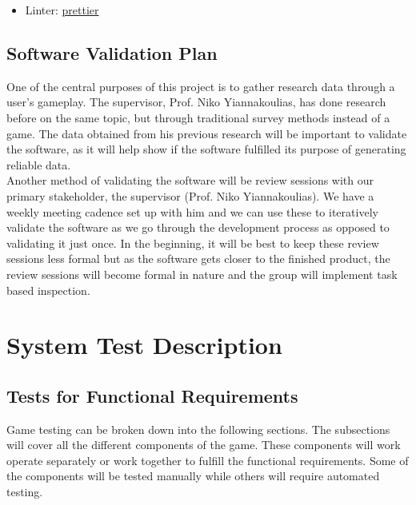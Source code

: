 \documentclass[12pt, titlepage]{article}
\begin{document}
\begin{itemize}
\item Linter: \href{https://prettier.io/}{prettier}
\end{itemize}

\subsection{Software Validation Plan}


  One of the central purposes of this project is to gather research data through a user's gameplay. The supervisor, Prof. Niko Yiannakoulias, has done research before on the same topic, but through traditional survey methods instead of a game. The data obtained from his previous research will be important to validate the software, as it will help show if the software fulfilled its purpose of generating reliable data.
  \\ 

Another method of validating the software will be review sessions with our primary stakeholder, the supervisor (Prof. Niko Yiannakoulias). We have a weekly meeting cadence set up with him and we can use these to iteratively validate the software as we go through the development process as opposed to validating it just once. In the beginning, it will be best to keep these review sessions less formal but as the software gets closer to the finished product, the review sessions will become formal in nature and the group will implement task based inspection.

\section{System Test Description}
	
\subsection{Tests for Functional Requirements}
\label{s5.1}

Game testing can be broken down into the following sections. The subsections will cover all the different components of the game. These components will work operate separately or work together to fulfill the functional requirements. Some of the components will be tested manually while others will require automated testing.
\end{document}
